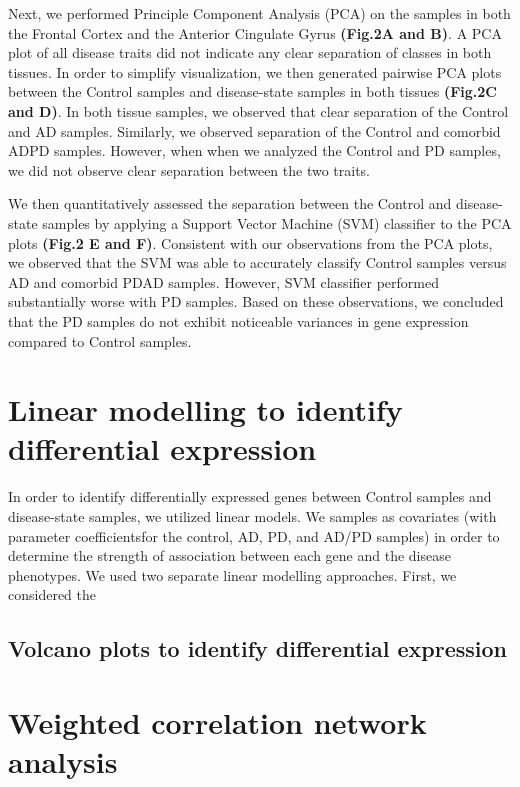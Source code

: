 Next, we performed Principle Component Analysis (PCA) on the samples in both the Frontal Cortex and the Anterior Cingulate Gyrus \textbf{(Fig.2A and B)}. A PCA plot of all disease traits did not indicate any clear separation of classes in both tissues. In order to simplify visualization, we then generated pairwise PCA plots between the Control samples and disease-state samples in both tissues \textbf{ (Fig.2C and D)}. In both tissue samples, we observed that clear separation of the Control and AD samples. Similarly, we observed separation of the Control and comorbid ADPD samples. However, when when we analyzed the Control and PD samples, we did not observe clear separation between the two traits.

We then quantitatively assessed the separation between the Control and disease-state samples by applying a Support Vector Machine (SVM) classifier to the PCA plots \textbf{(Fig.2 E and F)}. Consistent with our observations from the PCA plots, we observed that the SVM was able to accurately classify Control samples versus AD and comorbid PDAD samples. However, SVM classifier performed substantially worse with PD samples. Based on these observations, we concluded that the PD samples do not exhibit noticeable variances in gene expression compared to Control samples.

\section{Linear modelling to identify differential expression}
\label{sec:line-modell-ident}

In order to identify differentially expressed genes between Control samples and disease-state samples, we utilized linear models. We  samples as covariates (with parameter coefficientsfor the control, AD, PD, and AD/PD samples) in order to determine the strength of association between each gene and the disease phenotypes. We used two separate linear modelling approaches. First, we considered the

\subsection{Volcano plots to identify differential expression}
\label{subsec:volc-plots-ident}


\section{Weighted correlation network analysis}
\label{sec:weight-corr-netw}

